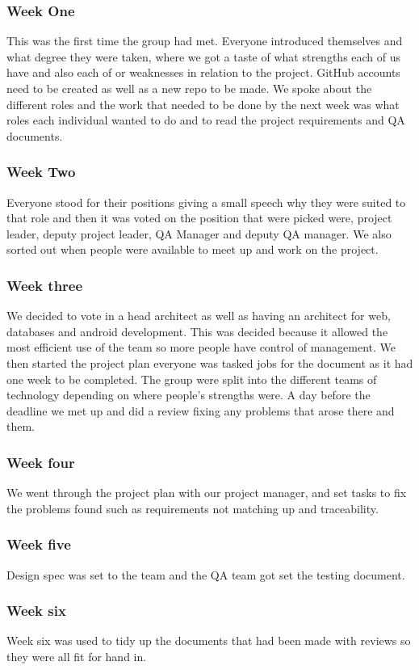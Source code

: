 \subsubsection{Week One}
	This was the first time the group had met. Everyone introduced themselves and what degree they were taken, where we got a taste of what strengths each of us have and also each of or weaknesses in relation to the project. GitHub accounts need to be created as well as a new repo to be made. We spoke about the different roles and the work that needed to be done by the next week was what roles each individual wanted to do and to read the project requirements and QA documents.
\subsubsection{Week Two}
	Everyone stood for their positions giving a small speech why they were suited to that role and then it was voted on the position that were picked were, project leader, deputy project leader, QA Manager and deputy QA manager. We also sorted out when people were available to meet up and work on the project.
\subsubsection{Week three}
	We decided to vote in a head architect as well as having an architect for web, databases and android development. This was decided because it allowed the most efficient use of the team so more people have control of management. We then started the project plan everyone was tasked jobs for the document as it had one week to be completed. The group were split into the different teams of technology depending on where people’s strengths were. A day before the deadline we met up and did a review fixing any problems that arose there and them.
\subsubsection{Week four}
	We went through the project plan with our project manager, and set tasks to fix the problems found such as requirements not matching up and traceability. 
\subsubsection{Week five}
	Design spec was set to the team and the QA team got set the testing document.
\subsubsection{Week six}
	Week six was used to tidy up the documents that had been made with reviews so they were all fit for hand in.
